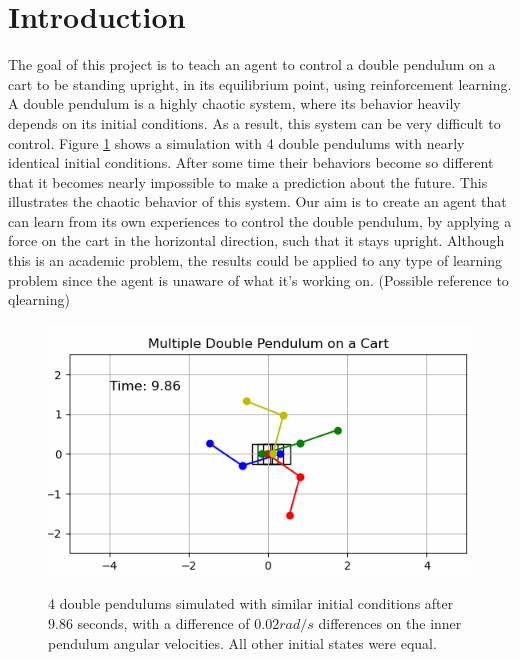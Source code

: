 \documentclass{LTHtwocol} %
\begin{document}
\section{Introduction}
The goal of this project is to teach an agent to control a double pendulum on a cart to be standing upright, in its equilibrium point, using reinforcement learning.
A double pendulum is a highly chaotic system, where its behavior heavily depends on its initial conditions.
As a result, this system can be very difficult to control.
Figure \ref{fig:double_pendulum_chaotic} shows a simulation with 4 double pendulums with nearly identical initial conditions.
After some time their behaviors become so different that it becomes nearly impossible to make a prediction about the future.
This illustrates the chaotic behavior of this system.
Our aim is to create an agent that can learn from its own experiences to control the double pendulum, by applying a force on the cart in the horizontal direction, such that it stays upright.
Although this is an academic problem, the results could be applied to any type of learning problem since the agent is unaware of what it's working on.
(Possible reference to qlearning)
\begin{figure}[H]
	\centering
	\includegraphics[width=0.9\columnwidth]{figures/Double_Pendulum_Chaotic.PNG}
	\label{fig:double_pendulum_chaotic}
	\caption{4 double pendulums simulated with similar initial conditions after $9.86$ seconds, with a difference of $0.02 rad/s$ differences on the inner pendulum angular velocities. All other initial states were equal.}
\end{figure}
\end{document}
